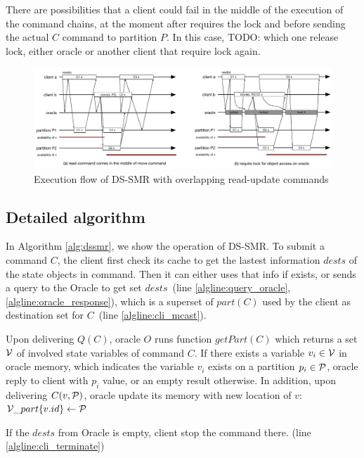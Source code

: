 There are possibilities that a client could fail in the middle of the execution of the command chains, at the moment after requires the lock and before sending the actual $C$ command to partition $P$. In this case, TODO: which one release lock, either oracle or another client that require lock again. 

\begin{figure}
\begin{minipage}[b]{1.0\linewidth} %
\centering
      \includegraphics[width=1\linewidth]{figures/update_overlap}
\end{minipage}
\caption{Execution flow of DS-SMR with overlapping read-update commands}
\label{fig:updateoverlap}
\end{figure}


\subsection{Detailed algorithm}
\label{sec:detailalg}

In Algorithm \ref{alg:dssmr}, we show the operation of DS-SMR. 
To submit a command $C$, the client first check its cache to get the lastest information $dests$ of the state objects in command. Then it can either uses that info if exists, or sends a query to the Oracle to get set $dests$~(line \ref{algline:query_oracle}, \ref{algline:oracle_response}), which is a superset of $part(C)$ used by the client as destination set for $C$~(line \ref{algline:cli_mcast}). 

Upon delivering $Q(C)$, oracle $O$ runs function $getPart(C)$ which returns a set $\mathcal{V}$ of involved state variables of command $C$. If there exists a variable $v_i \in \mathcal{V}$ in oracle memory, which indicates the variable $v_i$ exists on a partition $p_i \in \mathcal{P}$, oracle reply to client with $p_i$ value, or an empty result otherwise. In addition, upon delivering $C(v, \mathcal{P})$, oracle update its memory with new location of $v$: $\mathcal{V}\_part\{v.id\} \leftarrow \mathcal{P}$

If the $dests$ from Oracle is empty, client stop the command there. (line \ref{algline:cli_terminate})


